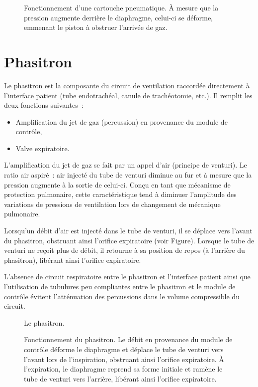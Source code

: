 \begin{figure}[h]
	
	\caption{Fonctionnement d'une cartouche pneumatique. À mesure que la pression
	augmente derrière le diaphragme, celui-ci se déforme, emmenant  le piston à
	obstruer l’arrivée de gaz.} 
\end{figure}

\section{Phasitron}

Le phasitron est la composante du circuit de ventilation raccordée directement à
l’interface patient (tube endotrachéal, canule de trachéotomie, etc.). Il
remplit les deux fonctions suivantes : 

\begin{itemize} 
	\item Amplification du jet de gaz (percussion) en provenance du module de contrôle,
	\item Valve expiratoire.
\end{itemize}

L’amplification du jet de gaz se fait par un appel d’air (principe de venturi).
Le ratio air aspiré : air injecté du tube de venturi diminue au fur et à mesure
que la pression augmente à la sortie de celui-ci. Conçu en tant que mécanisme de
protection pulmonaire, cette caractéristique tend à diminuer l’amplitude des
variations de pressions de ventilation lors de changement de mécanique
pulmonaire.

Lorsqu’un débit d’air est injecté dans le tube de venturi, il se déplace vers
l’avant du phasitron, obstruant ainsi l’orifice expiratoire (voir
Figure). Lorsque le tube de venturi ne reçoit plus de
débit, il retourne à sa position de repos (à l’arrière du phasitron), libérant
ainsi l’orifice expiratoire.

L’absence de circuit respiratoire entre le phasitron et l’interface patient
ainsi que l’utilisation de tubulures peu compliantes entre le phasitron et le
module de contrôle évitent l’atténuation des percussions dans le volume
compressible du circuit.

\begin{figure}
	
	\caption{Le phasitron.}
\end{figure}

\begin{figure}
	
	\caption{Fonctionnement du phasitron. Le débit en provenance du module de
contrôle déforme le diaphragme et déplace le tube de venturi vers l’avant lors
de l’inspiration, obstruant ainsi l’orifice expiratoire. À l’expiration, le
diaphragme reprend sa forme initiale et ramène le tube de venturi vers
l’arrière, libérant ainsi l’orifice expiratoire.} 
\end{figure}

